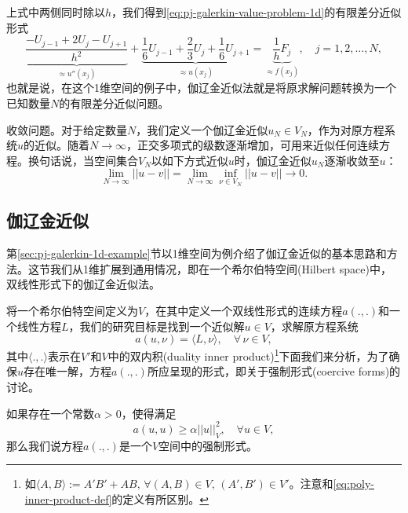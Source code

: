\begin{subappendices}
上式中两侧同时除以$h$，我们得到\eqref{eq:pj-galerkin-value-problem-1d}的有限差分近似形式
\begin{equation*}
  \underbrace{\frac{-U_{j-1} + 2U_j - U_{j+1}}{h^2}}_{\approx u''(x_j)} + \underbrace{\frac{1}{6} U_{j-1} + \frac{2}{3} U_j + \frac{1}{6} U_{j+1}}_{\approx u(x_j)} = \underbrace{\frac{1}{h}F_j}_{\approx f(x_j)}, \quad j=1,2,\ldots,N,
\end{equation*}
也就是说，在这个1维空间的例子中，伽辽金近似法就是将原求解问题转换为一个已知数量$N$的有限差分近似问题。

收敛问题。对于给定数量$N$，我们定义一个伽辽金近似$u_N \in V_N$，作为对原方程系统$u$的近似。随着$N \rightarrow \infty$，正交多项式的级数逐渐增加，可用来近似任何连续方程。换句话说，当空间集合$V_N$以如下方式近似$u$时，伽辽金近似$u_N$逐渐收敛至$u$：
\begin{equation*}
  \lim_{N \rightarrow \infty} ||u-v|| = \lim_{N \rightarrow \infty} \inf_{\nu \in V_{N} } ||u-v|| \rightarrow 0.
\end{equation*}

\subsection{伽辽金近似}
\label{sec:pj-galerkin-general}
第\ref{sec:pj-galerkin-1d-example}节以1维空间为例介绍了伽辽金近似的基本思路和方法。这节我们从1维扩展到通用情况，即在一个希尔伯特空间(Hilbert space)中，双线性形式下的伽辽金近似法。

将一个希尔伯特空间定义为$V$，在其中定义一个双线性形式的连续方程$a(.,.)$和一个线性方程$L$，我们的研究目标是找到一个近似解$u \in V$，求解原方程系统
\begin{equation}
  \label{eq:pj-galerkin-prob}
  a \left( u,\nu \right) = \langle L, \nu \rangle, \quad \forall \, \nu \in V,
\end{equation}
其中$\langle .,. \rangle$表示在$V'$和$V$中的双内积(duality inner product)\footnote{如$\langle A,B \rangle := A'B' + A B, \, \forall (A,B) \in V, \, (A',B') \in V'$。注意和\eqref{eq:poly-inner-product-def}的定义有所区别。}下面我们来分析，为了确保$u$存在唯一解，方程$a(.,.)$所应呈现的形式，即关于强制形式(coercive forms)的讨论。

\begin{definition}[方程的强制形式]
  如果存在一个常数$\alpha >0$，使得满足
  \begin{equation}
    \label{pj-galerkin-coercive-form-def}
    a(u,u) \ge \alpha ||u||_{V}^2, \quad \forall u \in V,
  \end{equation}
  那么我们说方程$a(.,.)$是一个$V$空间中的强制形式。
\end{definition}


\end{subappendices}
